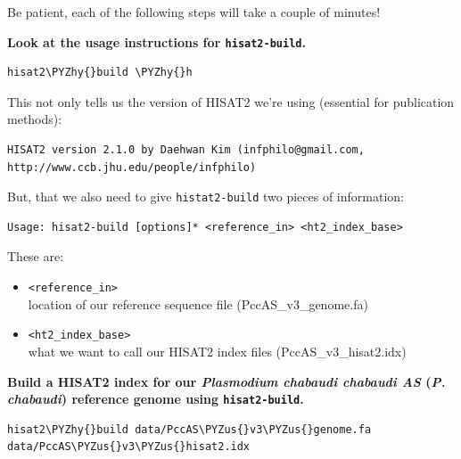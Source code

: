 \documentclass[11pt]{article}
\makeatletter
\def\PYZus{\char`\_}
\def\PYZhy{\char`\-}
\newcommand{\boxspacing}{\kern\kvtcb@left@rule\kern\kvtcb@boxsep}
\newcommand{\prompt}[4]{
        \ttfamily\llap{{\color{#2}[#3]:\hspace{3pt}#4}}\vspace{-\baselineskip}
    }
\makeatother
\begin{document}
    Be patient, each of the following steps will take a couple of minutes!

    \textbf{Look at the usage instructions for \texttt{hisat2-build}.}

    \begin{tcolorbox}[breakable, size=fbox, boxrule=1pt, pad at break*=1mm,colback=cellbackground, colframe=cellborder]
\prompt{In}{incolor}{ }{\boxspacing}
\begin{Verbatim}[commandchars=\\\{\}]
hisat2\PYZhy{}build \PYZhy{}h
\end{Verbatim}
\end{tcolorbox}

    This not only tells us the version of HISAT2 we're using (essential for
publication methods):

\begin{verbatim}
HISAT2 version 2.1.0 by Daehwan Kim (infphilo@gmail.com, http://www.ccb.jhu.edu/people/infphilo)
\end{verbatim}

But, that we also need to give \texttt{histat2-build} two pieces of
information:

\begin{verbatim}
Usage: hisat2-build [options]* <reference_in> <ht2_index_base>
\end{verbatim}

These are:

\begin{itemize}
\item
  \texttt{\textless{}reference\_in\textgreater{}}~\\
  location of our reference sequence file (PccAS\_v3\_genome.fa)
\item
  \texttt{\textless{}ht2\_index\_base\textgreater{}}~\\
  what we want to call our HISAT2 index files (PccAS\_v3\_hisat2.idx)
\end{itemize}

\newpage

    \textbf{Build a HISAT2 index for our \textit{Plasmodium chabaudi chabaudi
AS} (\textit{P. chabaudi}) reference genome using \texttt{hisat2-build}.}

    \begin{tcolorbox}[breakable, size=fbox, boxrule=1pt, pad at break*=1mm,colback=cellbackground, colframe=cellborder]
\prompt{In}{incolor}{ }{\boxspacing}
\begin{Verbatim}[commandchars=\\\{\}]
hisat2\PYZhy{}build data/PccAS\PYZus{}v3\PYZus{}genome.fa data/PccAS\PYZus{}v3\PYZus{}hisat2.idx
\end{Verbatim}
\end{tcolorbox}
\end{document}
